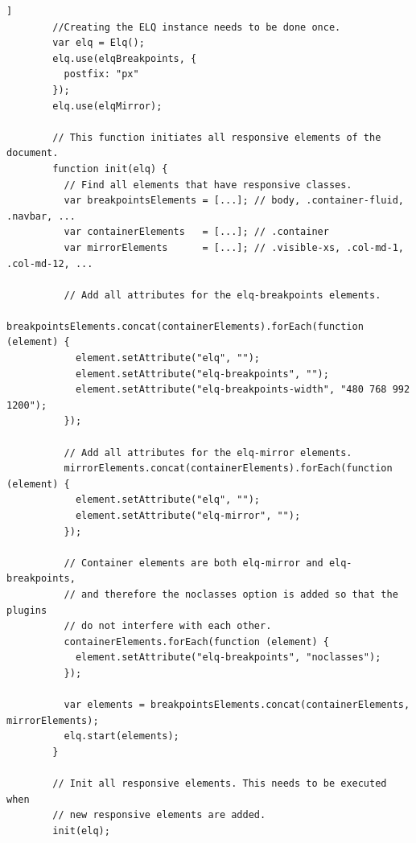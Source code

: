 \documentclass[a4paper,11pt]{kth-mag}
\begin{document}
      \begin{lstlisting}[gobble=8,label={code:bootstrap-init-js},caption={Example of \gls{JavaScript} code that adds the required \gls{ELQ} attributes dynamically to all \gls{responsive} \glspl{element} and initializes them.},captionpos=b]]
        //Creating the ELQ instance needs to be done once.
        var elq = Elq();
        elq.use(elqBreakpoints, {
          postfix: "px"
        });
        elq.use(elqMirror);

        // This function initiates all responsive elements of the document.
        function init(elq) {
          // Find all elements that have responsive classes.
          var breakpointsElements = [...]; // body, .container-fluid, .navbar, ...
          var containerElements   = [...]; // .container
          var mirrorElements      = [...]; // .visible-xs, .col-md-1, .col-md-12, ...

          // Add all attributes for the elq-breakpoints elements.
          breakpointsElements.concat(containerElements).forEach(function (element) {
            element.setAttribute("elq", "");
            element.setAttribute("elq-breakpoints", "");
            element.setAttribute("elq-breakpoints-width", "480 768 992 1200");
          });

          // Add all attributes for the elq-mirror elements.
          mirrorElements.concat(containerElements).forEach(function (element) {
            element.setAttribute("elq", "");
            element.setAttribute("elq-mirror", "");
          });

          // Container elements are both elq-mirror and elq-breakpoints,
          // and therefore the noclasses option is added so that the plugins 
          // do not interfere with each other.
          containerElements.forEach(function (element) {
            element.setAttribute("elq-breakpoints", "noclasses");
          });

          var elements = breakpointsElements.concat(containerElements, mirrorElements);
          elq.start(elements);
        }

        // Init all responsive elements. This needs to be executed when 
        // new responsive elements are added.
        init(elq);
      \end{lstlisting}
\end{document}
